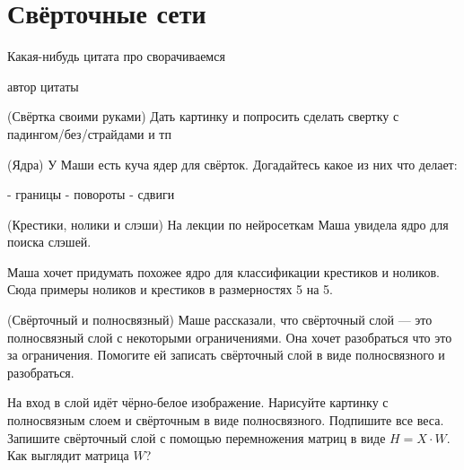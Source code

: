 
\section{Свёрточные сети}

\epigraph{Какая-нибудь цитата про сворачиваемся}{автор цитаты}


\begin{problem}{(Свёртка своими руками)}
Дать картинку и попросить сделать свертку с падингом/без/страйдами и тп
\end{problem}


\begin{problem}{(Ядра)}
У Маши есть куча ядер для свёрток. Догадайтесь какое из них что делает: 

- границы
- повороты
- сдвиги 
\end{problem}


\begin{problem}{(Крестики, нолики и слэши)}
На лекции по нейросеткам Маша увидела ядро для поиска слэшей. 


Маша хочет придумать похожее ядро для классификации крестиков и ноликов. Сюда примеры ноликов и крестиков в размерностях 5 на 5.
\end{problem}



\begin{problem}{(Свёрточный и полносвязный)}
Маше рассказали, что свёрточный слой --- это полносвязный слой с некоторыми ограничениями. Она хочет разобраться что это за ограничения. Помогите ей записать свёрточный слой в виде полносвязного и разобраться. 

На вход в слой идёт чёрно-белое изображение. Нарисуйте картинку с полносвязным слоем и свёрточным в виде полносвязного. Подпишите все веса. Запишите свёрточный слой с помощью перемножения матриц в виде $H = X \cdot W.$ Как выглядит матрица $W$? 
\end{problem}


